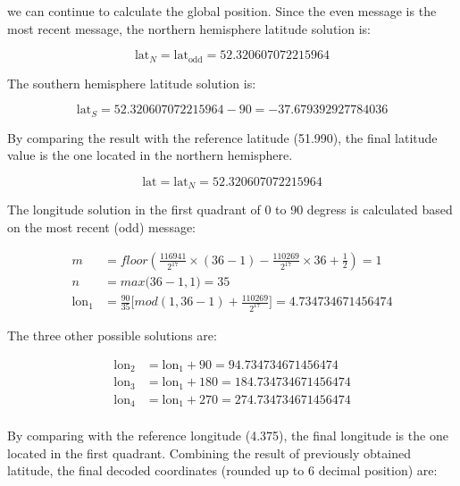we can continue to calculate the global position. Since the even message is the most recent message, the northern hemisphere latitude solution is:

\begin{equation}
  \mathrm{lat}_N = \mathrm{lat}_\mathrm{odd} = 52.320607072215964
\end{equation}


The southern hemisphere latitude solution is:

\begin{equation}
    \mathrm{lat}_S = 52.320607072215964 - 90 = -37.679392927784036
\end{equation}
  
By comparing the result with the reference latitude (51.990), the final latitude value is the one located in the northern hemisphere.

\begin{equation}
    \mathrm{lat} = \mathrm{lat}_N = 52.320607072215964
\end{equation}
  

The longitude solution in the first quadrant of 0 to 90 degress is calculated based on the most recent (odd) message:

\begin{align}
  m &= floor \left( \frac{116941}{2^{17}} \times (36-1) - \frac{110269}{2^{17}} \times 36 + \frac{1}{2}  \right) = 1\\
  n &= max \Big( 36-1, 1 \Big) = 35\\
    \mathrm{lon}_1 &= \frac{90}{35} \Big[ mod(1, 36-1) + \frac{110269}{2^{17}} \Big] = 4.734734671456474
\end{align}

The three other possible solutions are:

\begin{equation}
\begin{split}
    \mathrm{lon}_2 &= \mathrm{lon}_1 + 90 = 94.734734671456474 \\
    \mathrm{lon}_3 &= \mathrm{lon}_1 + 180 = 184.734734671456474 \\
    \mathrm{lon}_4 &= \mathrm{lon}_1 + 270 = 274.734734671456474 \\
\end{split}
\end{equation}

By comparing with the reference longitude (4.375), the final longitude is the one located in the first quadrant. Combining the result of previously obtained latitude, the final decoded coordinates (rounded up to 6 decimal position) are:


